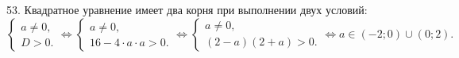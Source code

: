 53. Квадратное уравнение имеет два корня при выполнении двух условий:\\ $\begin{cases}a\neq0,\\ D>0.\end{cases}\Leftrightarrow
\begin{cases}a\neq0,\\ 16-4\cdot a \cdot a>0.\end{cases}\Leftrightarrow
\begin{cases}a\neq0,\\ (2-a)(2+a)>0.\end{cases}\Leftrightarrow a\in(-2;0)\cup(0;2).$\\
